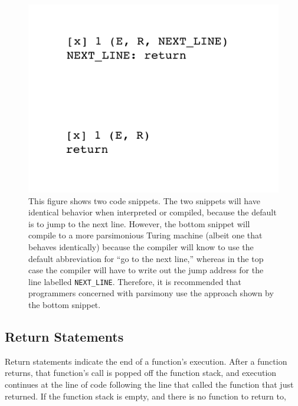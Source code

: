 \documentclass[11pt]{article}
\begin{document}
\begin{figure} 
\begin{center} 
\includegraphics[scale=0.4]{figs/defaultjump.png}
\caption{This figure shows two code snippets. The two snippets will have identical behavior when interpreted or compiled, because the default is to jump to the next line. However, the bottom snippet will compile to a more parsimonious Turing machine (albeit one that behaves identically) because the compiler will know to use the default abbreviation for ``go to the next line,'' whereas in the top case the compiler will have to write out the jump address for the line labelled \texttt{NEXT_LINE}. Therefore, it is recommended that programmers concerned with parsimony use the approach shown by the bottom snippet. \label{fig:defaultjump}} 
\end{center} 
\end{figure}

\subsection{Return Statements}

Return statements indicate the end of a function's execution. After a function returns, that function's call is popped off the function stack, and execution continues at the line of code following the line that called the function that just returned. If the function stack is empty, and there is no function to return to, 
\end{document}
